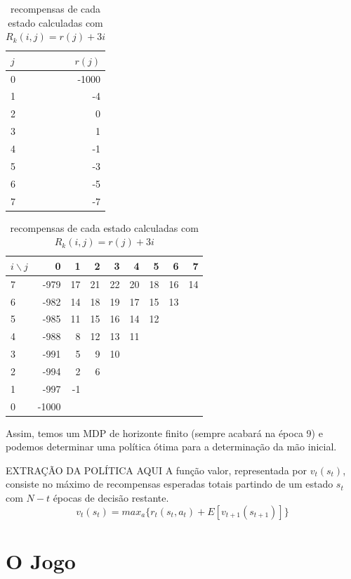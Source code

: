 \documentclass{book}
\begin{document}
\begin{table}[!h]
\parbox{.45\linewidth}{
\centering
\vspace{0.2cm}
\begin{tabular}{l|r}
$j$  & $r(j)$ \\ \hline
0 & -1000  \\
1 & -4     \\
2 & 0      \\
3 & 1      \\
4 & -1     \\
5 & -3    \\
6 & -5     \\
7 & -7
\end{tabular}
\caption{recompensas-base para $j = 0, \ldots, 7$}
\label{tab:rj}
}
\hfill
\parbox{.45\linewidth}{
\centering
\begin{tabular}{l|rrrrrrrr}
$i \backslash j$ & 0     & 1  & 2  & 3  & 4  & 5  & 6  & 7  \\ \hline
7 & -979  & 17 & 21 & 22 & 20 & 18 & 16 & 14 \\
6 & -982  & 14 & 18 & 19 & 17 & 15 & 13 &    \\
5 & -985  & 11 & 15 & 16 & 14 & 12 &    &    \\
4 & -988  & 8  & 12 & 13 & 11 &    &    &    \\
3 & -991  & 5  & 9  & 10 &    &    &    &    \\
2 & -994  & 2  & 6  &    &    &    &    &    \\
1 & -997  & -1 &    &    &    &    &    &    \\
0 & -1000 &    &    &    &    &    &    &
\end{tabular}
\caption{recompensas de cada estado calculadas com $R_k(i,j) = r(j) + 3i$}
\label{tab:Rij}
}
\end{table}
Assim, temos um MDP de horizonte finito (sempre acabará na época 9) e podemos determinar uma política ótima para a determinação da mão inicial.

EXTRAÇÃO DA POLÍTICA AQUI
A função valor, representada por $v_t(s_t)$, consiste
no máximo de recompensas esperadas totais partindo de um estado $s_t$ com $N-t$ épocas de decisão restante.
\begin{equation*}
  v_t(s_t) = max_a\{r_t(s_t,a_t) + E[v_{t+1}(s_{t+1})]\}
\end{equation*}

\pagebreak

\section{O Jogo}
\end{document}

